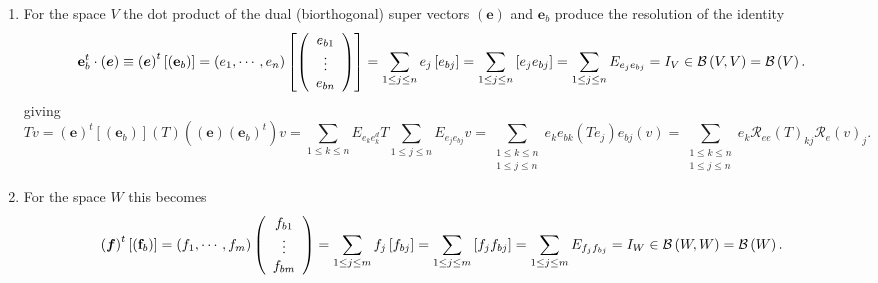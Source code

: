 \documentclass[aps,preprint]{revtex4}%
\begin{document}
\begin{enumerate}
\item For the space $V$ the dot product of the dual (biorthogonal) super
vectors $\left(  \boldsymbol{e}\right)  $ and $\mathbf{e}_{b}$ produce the
resolution of the identity
\begin{equation}
\mathbf{e}_{b}^{t}\cdot\left(  \boldsymbol{e}\right)  \equiv\left(
\boldsymbol{e}\right)  ^{t}\left[  \left(  \mathbf{e}_{b}\right)  \right]
=\left(  e_{1},\cdots,e_{n}\right)  \left[  \left(
\begin{array}
[c]{c}%
e_{b1}\\
\vdots\\
e_{bn}%
\end{array}
\right)  \right]  =\sum_{1\leq j\leq n}e_{j}\left[  e_{bj}\right]
=\sum_{1\leq j\leq n}\left[  e_{j}e_{bj}\right]  =\sum_{1\leq j\leq n}%
E_{e_{j}e_{bj}}=I_{V}\in\mathcal{B}\left(  V,V\right)  =\mathcal{B}\left(
V\right)  .
\end{equation}
giving
\begin{equation}
Tv=\left(  \boldsymbol{e}\right)  ^{t}\left[  \left(  \mathbf{e}_{b}\right)
\right]  \left(  T\right)  \left(  \left(  \boldsymbol{e}\right)  \left(
\mathbf{e}_{b}\right)  ^{t}\right)  v=\sum_{1\leq k\leq n}E_{e_{k}e_{k}^{d}%
}T\sum_{1\leq j\leq n}E_{e_{j}e_{bj}}v=\sum_{\substack{1\leq k\leq n\\1\leq
j\leq n}}e_{k}e_{bk}\left(  Te_{j}\right)  e_{bj}\left(  v\right)
=\sum_{\substack{1\leq k\leq n\\1\leq j\leq n}}e_{k}\mathcal{R}_{ee}\left(
T\right)  _{kj}\mathcal{R}_{e}\left(  v\right)  _{j}.
\end{equation}


\item For the space $W$ this becomes
\begin{equation}
\left(  \boldsymbol{f}\right)  ^{t}\left[  \left(  \mathbf{f}_{b}\right)
\right]  =\left(  f_{1},\cdots,f_{m}\right)  \left(
\begin{array}
[c]{c}%
f_{b1}\\
\vdots\\
f_{bm}%
\end{array}
\right)  =\sum_{1\leq j\leq m}f_{j}\left[  f_{bj}\right]  =\sum_{1\leq j\leq
m}\left[  f_{j}f_{bj}\right]  =\sum_{1\leq j\leq m}E_{f_{j}f_{bj}}=I_{W}%
\in\mathcal{B}\left(  W,W\right)  =\mathcal{B}\left(  W\right)  .
\end{equation}



\end{enumerate}
\end{document}
